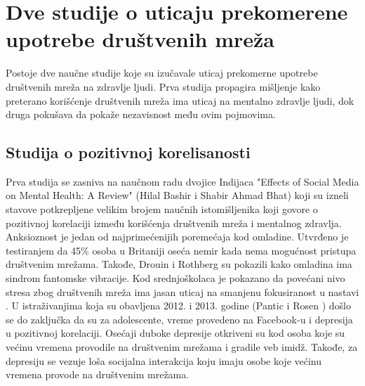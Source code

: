 \documentclass[a4paper]{article}
\begin{document}
{\begin{itemize}
		\end{itemize}
	
		\section{Dve studije o uticaju prekomerene upotrebe društvenih mreža}	
		Postoje dve naučne studije koje su izučavale uticaj prekomerne upotrebe društvenih mreža na zdravlje ljudi. Prva studija propagira mišljenje kako preterano korišćenje društvenih mreža ima uticaj na mentalno zdravlje ljudi, dok druga pokušava da pokaže nezavisnost među ovim pojmovima.\\
		\subsection{Studija o pozitivnoj korelisanosti}
		Prva studija se zasniva na naučnom radu dvojice Indijaca "Effects of Social Media on Mental Health: A Review" \cite{prva} (Hilal Bashir i Shabir Ahmad Bhat) koji su izneli stavove potkrepljene velikim brojem naučnih istomišljenika koji govore o pozitivnoj korelaciji između korišćenja društvenih mreža i mentalnog zdravlja. Anksioznost je jedan od najprimećenijih poremećaja kod omladine. Utvrđeno je testiranjem da 45\%  osoba u Britaniji oseća nemir kada nema mogućnost pristupa društvenim mrežama. Takođe, Drouin \cite{Drouin} i Rothberg \cite{Rothberg} su pokazili kako omladina ima sindrom fantomske vibracije. Kod srednjoškolaca je pokazano da povećani nivo stresa zbog društvenih mreža ima jasan uticaj na smanjenu fokusiranost u nastavi \cite{bashir}.  U istraživanjima koja su obavljena 2012. i 2013. godine (Pantic \cite{panic} i Rosen \cite{rosen}) došlo se do zaključka da su za adolescente, vreme provedeno na Facebook-u i depresija u pozitivnoj korelaciji. Osećaji duboke depresije otkriveni su kod osoba koje su većinu vremena provodile na društvenim mrežama i gradile veb imidž. Takođe, za depresiju se vezuje loša socijalna interakcija koju imaju osobe koje većinu vremena provode na društvenim mrežama.\\
}
\end{document}
